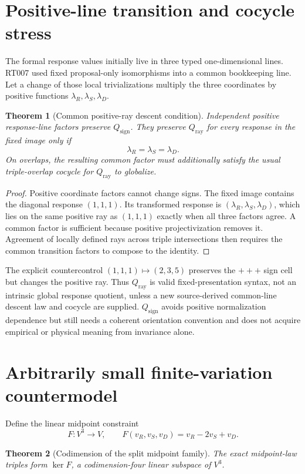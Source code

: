 \documentclass[11pt]{article}
\newtheorem{theorem}{Theorem}
\newcommand{\Qray}{Q_{\mathrm{ray}}}
\newcommand{\Qsign}{Q_{\mathrm{sign}}}
\begin{document}
\section{Positive-line transition and cocycle stress}

The formal response values initially live in three typed one-dimensional
lines.  RT007 used fixed proposal-only isomorphisms into a common bookkeeping
line.  Let a change of those local trivializations multiply the three
coordinates by positive functions $\lambda_R,\lambda_S,\lambda_D$.

\begin{theorem}[Common positive-ray descent condition]
Independent positive response-line factors preserve $\Qsign$.  They preserve
$\Qray$ for every response in the fixed image only if
\[
 \lambda_R=\lambda_S=\lambda_D.
\]
On overlaps, the resulting common factor must additionally satisfy the usual
triple-overlap cocycle for $\Qray$ to globalize.
\end{theorem}

\begin{proof}
Positive coordinate factors cannot change signs.  The fixed image contains
the diagonal response $(1,1,1)$.  Its transformed response is
$(\lambda_R,\lambda_S,\lambda_D)$, which lies on the same positive ray as
$(1,1,1)$ exactly when all three factors agree.  A common factor is sufficient
because positive projectivization removes it.  Agreement of locally defined
rays across triple intersections then requires the common transition factors
to compose to the identity.
\end{proof}

The explicit countercontrol $(1,1,1)\mapsto(2,3,5)$ preserves the $+++$ sign
cell but changes the positive ray.  Thus $\Qray$ is valid fixed-presentation
syntax, not an intrinsic global response quotient, unless a new source-derived
common-line descent law and cocycle are supplied.  $\Qsign$ avoids positive
normalization dependence but still needs a coherent orientation convention and
does not acquire empirical or physical meaning from invariance alone.

\section{Arbitrarily small finite-variation countermodel}

Define the linear midpoint constraint
\[
 F:V^3\longrightarrow V,\qquad
 F(v_R,v_S,v_D)=v_R-2v_S+v_D.
\]

\begin{theorem}[Codimension of the split midpoint family]
The exact midpoint-law triples form $\ker F$, a codimension-four linear
subspace of $V^3$.
\end{theorem}
\end{document}
